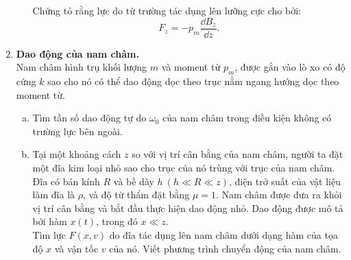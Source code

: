 \begin{vd}
\begin{enumerate}[1)]
\begin{enumerate}[a)]
\begin{center}
    \end{center}
    Chứng tỏ rằng lực do từ trường tác dụng lên lưỡng cực cho bởi:
    \[F_{z}=-p_{m} \dfrac{\dd B_{z}}{\dd z}.\]
\end{enumerate}
\item \textbf{Dao động của nam châm.}\\
Nam châm hình trụ khối lượng $m$ và moment từ $p_m$, được gắn vào lò xo có độ cứng $k$ sao cho nó có thể dao động dọc theo trục nằm ngang hướng dọc theo moment từ.
\begin{enumerate}[a)]
    \item Tìm tần số dao động tự do $\omega_0$ của nam châm trong điều kiện không có trường lực bên ngoài.
    \item Tại một khoảng cách $z$ so với vị trí cân bằng của nam châm, người ta đặt một đĩa kim loại nhỏ sao cho trục của nó trùng với trục của nam châm. Đĩa có bán kính $R$ và bề dày $h~(h \ll R \ll z)$, điện trở suất của vật liệu làm đĩa là $\rho$, và độ từ thẩm đặt bằng $\mu=1$. Nam châm được đưa ra khỏi vị trí cân bằng và bắt đầu thực hiện dao động nhỏ. Dao động được mô tả bởi hàm $x(t)$, trong đó $x \ll z$.\\
    Tìm lực $F(x, v)$ do đĩa tác dụng lên nam châm dưới dạng hàm của tọa độ $x$ và vận tốc $v$ của nó. Viết phương trình chuyển động của nam châm.
\begin{center}
 

\end{center}
\end{enumerate}
\end{enumerate}
\end{vd}

